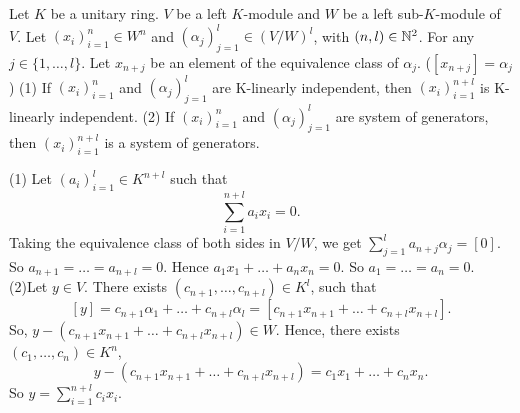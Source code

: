 \begin{theoremenv}\label{6.10.5}
    Let $K$ be a unitary ring. $V$ be a left $K$-module  and $W$ be a left sub-$K$-module of $V$. Let $(x_i)_{i=1}^{n}\in W^n$ and $\left(\alpha_j\right)_{j=1}^l\in \left(V/W\right)^l$, with $(n,l)\in \mathbb{N}^2$. For any $j\in \{1,\dots,l\}$. Let $x_{n+j}$ be an element of the equivalence class of $\alpha_j$. ($[x_{n+j}]=\alpha_j$)
    \newline
    (1) If $(x_i)_{i=1}^n$ and $(\alpha_j)_{j=1}^l$ are K-linearly independent, then $(x_i)_{i=1}^{n+l}$ is K-linearly independent.
    \newline
    (2) If $(x_i)_{i=1}^{n}$ and $(\alpha_j)_{j=1}^l$ are system of generators, then $(x_i)_{i=1}^{n+l}$ is a system of generators. 
\end{theoremenv}
\begin{proofenv}
    \quad\newline
    (1) Let $(a_i)_{i=1}^l\in K^{n+l}$ such that 
    $$\sum_{i=1}^{n+l}a_ix_i=0.$$
    Taking the equivalence class of both sides in $V/W$, we get $\displaystyle \sum_{j=1}^{l}a_{n+j}\alpha_j=[0]$. So $a_{n+1}=\dots=a_{n+l}=0$. Hence $a_1x_1+\dots+a_nx_n=0$. So $a_1=\dots=a_n=0$.
    \newline
    (2)Let $y\in V$. There exists $(c_{n+1},\dots,c_{n+l})\in K^l$, such that 
    $$[y]=c_{n+1}\alpha_1+\dots +c_{n+l}\alpha_l=[c_{n+1}x_{n+1}+\dots+c_{n+l}x_{n+l}].$$
    So, $y-\left(c_{n+1}x_{n+1}+\dots+c_{n+l}x_{n+l}\right)\in W$. Hence, there exists $(c_1,\dots,c_n)\in K^n$,
    $$y-\left(c_{n+1}x_{n+1}+\dots+c_{n+l}x_{n+l}\right)=c_1x_1+\dots+c_nx_n.$$
    So $\displaystyle y= \sum_{i=1}^{n+l}c_ix_i$.
\end{proofenv}


